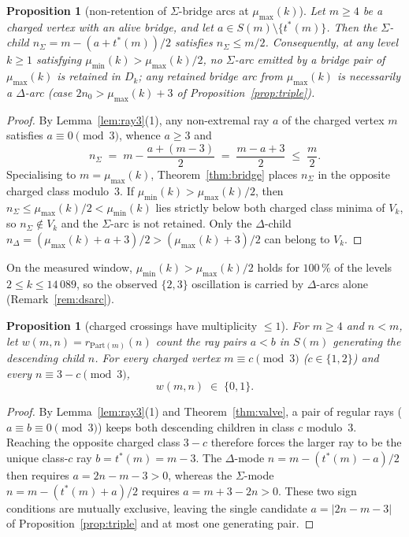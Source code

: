 \documentclass[11pt]{article}
\theoremstyle{plain}
\newtheorem{proposition}[theorem]{Proposition}
\theoremstyle{definition}
\newcommand{\rays}{S}
\newcommand{\Vk}{V_{k}}
\newcommand{\Dk}{D_{k}}
\newcommand{\tstar}{t^{\ast}}
\begin{document}
\begin{proposition}[non-retention of $\Sigma$-bridge arcs at $\mu_{\max}(k)$]
\label{prop:sigmabridge}
Let $m \ge 4$ be a charged vertex with an alive bridge, and let
$a \in \rays(m) \setminus \{\tstar(m)\}$. Then the $\Sigma$-child
$n_\Sigma = m - (a + \tstar(m))/2$ satisfies $n_\Sigma \le m/2$.
Consequently, at any level $k \ge 1$ satisfying
$\mu_{\min}(k) > \mu_{\max}(k)/2$, no $\Sigma$-arc emitted by a
bridge pair of $\mu_{\max}(k)$ is retained in $\Dk$; any retained
bridge arc from $\mu_{\max}(k)$ is necessarily a $\Delta$-arc (case
$2n_0 > \mu_{\max}(k) + 3$ of Proposition~\ref{prop:triple}).
\end{proposition}

\begin{proof}
By Lemma~\ref{lem:ray3}(1), any non-extremal ray $a$ of the charged
vertex $m$ satisfies $a \equiv 0 \pmod 3$, whence $a \ge 3$ and
\[
n_\Sigma \;=\; m - \frac{a + (m-3)}{2}
\;=\; \frac{m - a + 3}{2} \;\le\; \frac{m}{2}.
\]
Specialising to $m = \mu_{\max}(k)$, Theorem~\ref{thm:bridge} places
$n_\Sigma$ in the opposite charged class modulo~$3$. If
$\mu_{\min}(k) > \mu_{\max}(k)/2$, then
$n_\Sigma \le \mu_{\max}(k)/2 < \mu_{\min}(k)$ lies strictly below
both charged class minima of $\Vk$, so $n_\Sigma \notin \Vk$ and
the $\Sigma$-arc is not retained. Only the $\Delta$-child
$n_\Delta = (\mu_{\max}(k) + a + 3)/2 > (\mu_{\max}(k) + 3)/2$ can
belong to $\Vk$.
\end{proof}

On the measured window, $\mu_{\min}(k) > \mu_{\max}(k)/2$ holds for
$100\,\%$ of the levels $2 \le k \le 14\,089$, so the observed
$\{2,3\}$ oscillation is carried by $\Delta$-arcs alone
(Remark~\ref{rem:dsarc}).

\begin{proposition}[charged crossings have multiplicity $\le 1$]
\label{prop:thick}
For $m \ge 4$ and $n < m$, let $w(m,n) = r_{\mathrm{Part}(m)}(n)$
count the ray pairs $a < b$ in $\rays(m)$ generating the descending
child $n$. For every charged vertex $m \equiv c \pmod 3$
($c \in \{1,2\}$) and every $n \equiv 3 - c \pmod 3$,
\[
w(m,n) \;\in\; \{0,1\} .
\]
\end{proposition}

\begin{proof}
By Lemma~\ref{lem:ray3}(1) and Theorem~\ref{thm:valve}, a pair of
regular rays ($a \equiv b \equiv 0 \pmod 3$) keeps both descending
children in class $c$ modulo~$3$. Reaching the opposite charged
class $3 - c$ therefore forces the larger ray to be the unique
class-$c$ ray $b = \tstar(m) = m - 3$. The $\Delta$-mode
$n = m - (\tstar(m) - a)/2$ then requires $a = 2n - m - 3 > 0$,
whereas the $\Sigma$-mode $n = m - (\tstar(m) + a)/2$ requires
$a = m + 3 - 2n > 0$. These two sign conditions are mutually
exclusive, leaving the single candidate $a = |2n - m - 3|$ of
Proposition~\ref{prop:triple} and at most one generating pair.
\end{proof}
\end{document}
